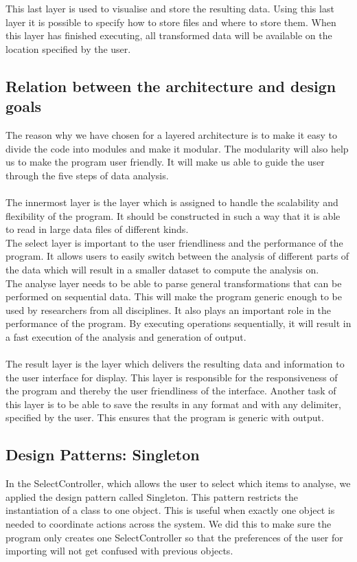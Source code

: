 \documentclass[a4paper,english,fleqn]{exam}
\begin{document}
This last layer is used to visualise and store the resulting data. Using this last layer it is possible to specify how to store files and where to store them. When this layer has finished executing, all transformed data will be available on the location specified by the user.

\subsection{Relation between the architecture and design goals}
The reason why we have chosen for a layered architecture is to make it easy to divide the code into modules and make it modular. The modularity will also help us to make the program user friendly. It will make us able to guide the user through the five steps of data analysis. \\ \\
The innermost layer is the layer which is assigned to handle the scalability and flexibility of the program. It should be constructed in such a way that it is able to read in large data files of different kinds.
\\
The select layer is important to the user friendliness and the performance of the program. It allows users to easily switch between the analysis of different parts of the data which will result in a smaller dataset to compute the analysis on.
\\
The analyse layer needs to be able to parse general transformations that can be performed on sequential data. This will make the program generic enough to be used by researchers from all disciplines. It also plays an important role in the performance of the program. By executing operations sequentially, it will result in a fast execution of the analysis and generation of output.
\\ 
\\
The result layer is the layer which delivers the resulting data and information to the user interface for display. This layer is responsible for the responsiveness of the program and thereby the user friendliness of the interface. Another task of this layer is to be able to save the results in any format and with any delimiter, specified by the user. This ensures that the program is generic with output. 

\subsection{Design Patterns: Singleton}
In the SelectController, which allows the user to select which items to analyse, we applied the design pattern called Singleton. This pattern restricts the instantiation of a class to one object. This is useful when exactly one object is needed to coordinate actions across the system. We did this to make sure the program only creates one SelectController so that the preferences of the user for importing will not get confused with previous objects. 
\end{document}
